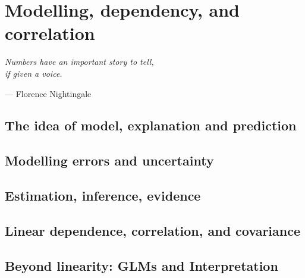 \chapter{Modelling, dependency, and correlation}
\label{chapter5}

\epigraph{\textit{Numbers have an important story to tell,\\if given a voice.}}{— Florence Nightingale}

\section{The idea of model, explanation and prediction}

\section{Modelling errors and uncertainty}

\section{Estimation, inference, evidence}

\section{Linear dependence, correlation, and covariance}

\section{Beyond linearity: GLMs and Interpretation}
